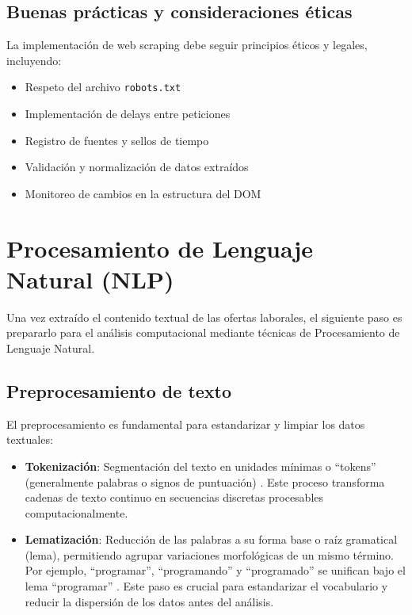 \subsection{Buenas prácticas y consideraciones éticas}

La implementación de web scraping debe seguir principios éticos y legales, incluyendo:

\begin{itemize}
    \item Respeto del archivo \texttt{robots.txt}
    \item Implementación de delays entre peticiones
    \item Registro de fuentes y sellos de tiempo
    \item Validación y normalización de datos extraídos
    \item Monitoreo de cambios en la estructura del DOM
\end{itemize}

\section{Procesamiento de Lenguaje Natural (NLP)}

Una vez extraído el contenido textual de las ofertas laborales, el siguiente paso es prepararlo para el análisis computacional mediante técnicas de Procesamiento de Lenguaje Natural.

\subsection{Preprocesamiento de texto}

El preprocesamiento es fundamental para estandarizar y limpiar los datos textuales:

\begin{itemize}
    \item \textbf{Tokenización}: Segmentación del texto en unidades mínimas o ``tokens'' (generalmente palabras o signos de puntuación) \cite{nguyen2024}. Este proceso transforma cadenas de texto continuo en secuencias discretas procesables computacionalmente.

    \item \textbf{Lematización}: Reducción de las palabras a su forma base o raíz gramatical (lema), permitiendo agrupar variaciones morfológicas de un mismo término. Por ejemplo, ``programar'', ``programando'' y ``programado'' se unifican bajo el lema ``programar'' \cite{echeverria2022}. Este paso es crucial para estandarizar el vocabulario y reducir la dispersión de los datos antes del análisis.
\end{itemize}

